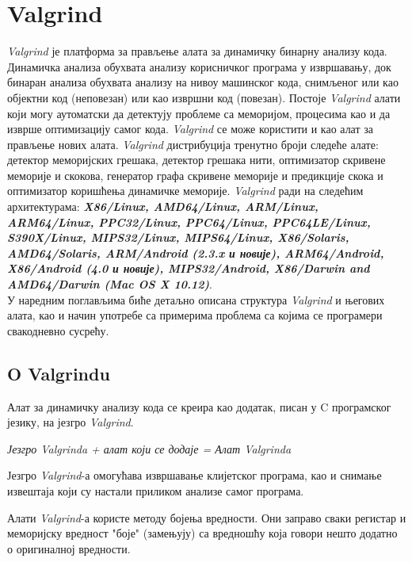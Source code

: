 \documentclass[12pt,oneside]{memoir}
\begin{document}
\chapter{Valgrind}
\label{chp:valgrind}

\indent \textit{Valgrind} је платформа за прављење алата за динамичку бинарну анализу кода. Динамичка анализа обухвата анализу корисничког програма у извршавању, док бинаран анализа обухвата анализу на нивоу машинског кода, снимљеног или као објектни код (неповезан) или као извршни код (повезан). Постоје \textit{Valgrind} алати који могу аутоматски да детектују проблеме са меморијом, процесима као и да изврше оптимизацију самог кода. \textit{Valgrind} се може користити и као алат за прављење нових алата. \textit{Valgrind} дистрибуција тренутно броји следеће алате: детектор меморијских грешака, детектор грешака нити, оптимизатор скривене меморије и скокова, генератор графа скривене меморије и предикције скока и оптимизатор коришћења динамичке меморије. \textit{Valgrind} ради на следећим архитектурама: \textbf{\textit{X86/Linux, AMD64/Linux, ARM/Linux, ARM64/Linux, PPC32/Linux, PPC64/Linux, PPC64LE/Linux, S390X/Linux, MIPS32/Linux, MIPS64/Linux, X86/Solaris, AMD64/Solaris, ARM/Android (2.3.x и новије), ARM64/Android, X86/Android (4.0 и новије), MIPS32/Android, X86/Darwin and AMD64/Darwin (Mac OS X 10.12)}}. \\

\indent У наредним поглављима биће детаљно описана структура \textit{Valgrind} и његових алата, као и начин употребе са примерима проблема са којима се програмери свакодневно сусрећу.

\section{O Valgrindu}

\indent Алат за динамичку анализу кода се креира као додатак, писан у C програмског језику, на језгро \textit{Valgrind}. 


\begin{center}
\textit{Језгро Valgrinda + алат који се додаје = Алат Valgrinda} 
\end{center}


\indent Језгро \textit{Valgrind}-а омогућава извршавање клијетског програма, као и снимање извештаја који су настали приликом анализе самог програма. 

\indent Алати \textit{Valgrind}-а користе методу бојења вредности. Они заправо сваки регистар и меморијску вредност "боје" (замењују) са вредношћу која говори нешто додатно о оригиналној вредности. 
\end{document}
